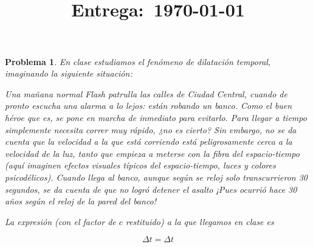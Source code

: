 \documentclass[12pt]{article}
\title{
    \textbf{\homeworknumber}\\
    \normalsize\vspace{0.1in}\small{\textbf{Entrega}:~\today}
    \vspace{-1.5in}
}
\author{}
\date{}
\theoremstyle{break}
\newtheorem{exercise}{Problema}
\theoremstyle{nonumberbreak}
\newcommand*{\change}[1]{\Delta{#1}\xspace}
\begin{document}
    \maketitle
    \thispagestyle{fancy}
    
    \begin{exercise}
        En clase estudiamos el fenómeno de dilatación temporal, imaginando la siguiente situación:\par

        Una mañana normal Flash patrulla las calles de Ciudad Central, cuando de pronto escucha una alarma a lo lejos: están robando un banco. Como el buen héroe que es, se pone en marcha de inmediato para evitarlo. Para llegar a tiempo simplemente necesita correr muy rápido, ¿no es cierto? Sin embargo, no se da cuenta que la velocidad a la que está corriendo está peligrosamente cerca a la velocidad de la luz, tanto que empieza a meterse con la fibra del espacio-tiempo (aquí imaginen efectos visuales típicos del espacio-tiempo, luces y colores psicodélicos). Cuando llega al banco, aunque según se reloj solo transcurrieron 30 segundos, se da cuenta de que no logró detener el asalto ¡Pues ocurrió hace 30 años según el reloj de la pared del banco!\par

        La expresión (con el factor de \(c\) restituido) a la que llegamos en clase es

        \begin{equation}
            \change{t} = \Delta t
        \end{equation}
    \end{exercise}
\end{document}
